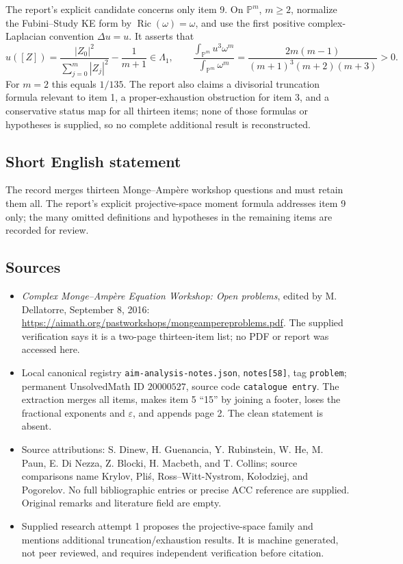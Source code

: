 \documentclass[11pt]{article}
\newcommand{\PP}{\mathbb{P}}
\begin{document}
The report's explicit candidate concerns only item 9. On \(\PP^m\), \(m\geq2\), normalize the Fubini--Study KE form by \(\operatorname{Ric}(\omega)=\omega\), and use the first positive complex-Laplacian convention \(\Delta u=u\). It asserts that
\[
u([Z])=\frac{|Z_0|^2}{\sum_{j=0}^m|Z_j|^2}-\frac1{m+1}\in\Lambda_1,
\qquad
\frac{\int_{\PP^m}u^3\omega^m}{\int_{\PP^m}\omega^m}
=\frac{2m(m-1)}{(m+1)^3(m+2)(m+3)}>0.
\]
For \(m=2\) this equals \(1/135\). The report also claims a divisorial truncation formula relevant to item 1, a proper-exhaustion obstruction for item 3, and a conservative status map for all thirteen items; none of those formulas or hypotheses is supplied, so no complete additional result is reconstructed.
\subsection{Short English statement}
The record merges thirteen Monge--Amp\`ere workshop questions and must retain them all. The report's explicit projective-space moment formula addresses item 9 only; the many omitted definitions and hypotheses in the remaining items are recorded for review.
\subsection{Sources}
\begin{itemize}
\item \emph{Complex Monge--Amp\`ere Equation Workshop: Open problems}, edited by M. Dellatorre, September 8, 2016: \url{https://aimath.org/pastworkshops/mongeampereproblems.pdf}. The supplied verification says it is a two-page thirteen-item list; no PDF or report was accessed here.
\item Local canonical registry \texttt{aim-analysis-notes.json}, \texttt{notes[58]}, tag \texttt{problem}; permanent UnsolvedMath ID \(20000527\), source code \texttt{catalogue entry}. The extraction merges all items, makes item 5 ``15'' by joining a footer, loses the fractional exponents and \(\varepsilon\), and appends page 2. The clean statement is absent.
\item Source attributions: S. Dinew, H. Guenancia, Y. Rubinstein, W. He, M. Paun, E. Di Nezza, Z. Blocki, H. Macbeth, and T. Collins; source comparisons name Krylov, Pli\'s, Ross--Witt-Nystrom, Ko\l odziej, and Pogorelov. No full bibliographic entries or precise ACC reference are supplied. Original remarks and literature field are empty.
\item Supplied research attempt 1 proposes the projective-space family and mentions additional truncation/exhaustion results. It is machine generated, not peer reviewed, and requires independent verification before citation.
\end{itemize}
\end{document}
